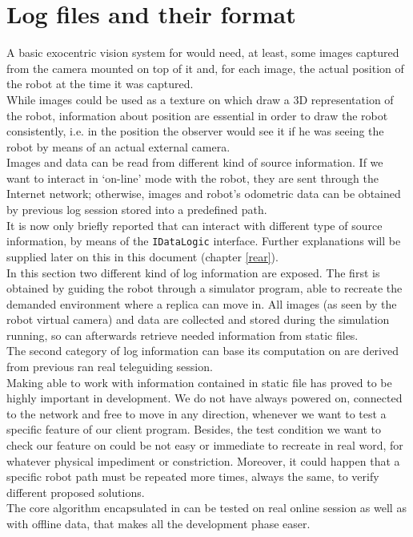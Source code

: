 \setcounter{figure}{0}
\setcounter{table}{0}
\setcounter{lstlisting}{0}

\chapter{Log files and their format}
\label{log}
\minitoc

A basic exocentric vision system for \morduc{} would need, 
at least, some images captured from the camera mounted 
on top of it and, for each image, the actual position of 
the robot at the time it was captured.
\\
While images could be used as a texture on which draw 
a 3D representation of the robot, information about 
position are essential in order to draw the robot 
consistently, i.e. in the position the observer would 
see it if he was seeing the robot by means of an actual 
external camera.
\\
Images and data can be read from different kind of source 
information. If we want to interact in `on-line' mode with
the robot, they are sent through the Internet network;
otherwise, images and robot's odometric data can be
obtained by previous log session stored into a predefined
path.
\\
It is now only briefly reported that
\framework{} can interact with different type of source
information, by means of the \texttt{IDataLogic} interface.
Further explanations will be supplied later on this in this
document (chapter \ref{rear}).
\\
In this section two different kind of log information are
exposed. The first is obtained by guiding the robot through
a simulator program, able to recreate the demanded environment
where a \morduc{} replica can move in. All images (as seen by
the robot virtual camera) and data are collected and stored
during the simulation running, so \framework{} can afterwards
retrieve needed information from static files.
\\
The second category of log information \framework{} can base
its computation on are derived from previous ran 
real \morduc{} teleguiding
session.
\\
Making \framework{} able to work with information contained in
static file has proved to be highly important in development.
We do not have \morduc{} always powered on, connected to the
network and free to move in any direction, whenever
we want to test a specific feature of our client program. Besides,
the test condition we want to check our feature on could be not easy
or immediate to recreate in real word, for whatever physical
impediment or constriction. Moreover, it could happen that a specific
robot
path must be repeated more times, always the same, to verify
different proposed solutions.
\\
The core algorithm encapsulated in \framework{} can be tested
on real online session as well as with offline data, that 
makes all the development phase easer.

\clearpage


\clearpage

